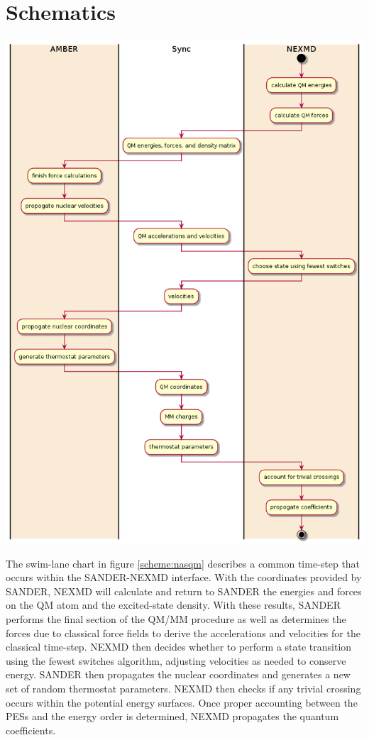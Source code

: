 \section{Schematics}
\noindent
\begin{minipage}[c]{\textwidth}
  \centering
  \includegraphics[width=0.7\linewidth]{../Paper2/scripted_diagrams/nasqm_overview.png}
  \label{scheme:nasqm}
\end{minipage}\bigskip

The swim-lane chart in figure \ref{scheme:nasqm} describes a
common time-step that occurs within the SANDER-NEXMD
interface. With the coordinates provided by SANDER, NEXMD will
calculate and return to SANDER the energies and forces on the QM
atom and the excited-state density. With these results, SANDER
performs the final section of the QM/MM procedure as well as
determines the forces due to classical force fields to derive
the accelerations and velocities for the classical time-step. NEXMD then decides whether to perform a state transition
using the fewest switches algorithm, adjusting velocities as
needed to conserve energy. SANDER then propagates the nuclear
coordinates and generates a new set of random thermostat
parameters. NEXMD then checks if any trivial crossing occurs
within the potential energy surfaces. Once proper accounting
between the PESs and the energy order is determined, NEXMD
propagates the quantum coefficients.

